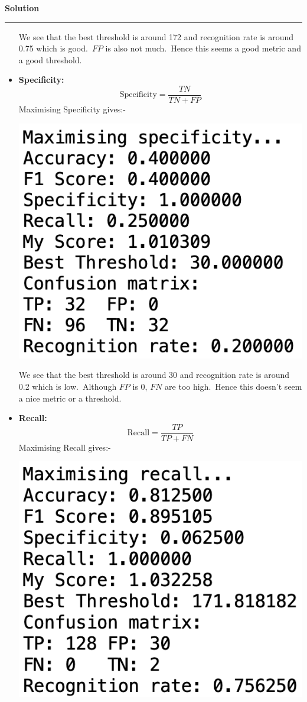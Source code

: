 \documentclass[a4paper,12pt]{article}
\newenvironment{solution}[2][]{%
    \begin{mdframed}[linecolor=blue!70!black, linewidth=2pt, roundcorner=10pt, backgroundcolor=yellow!10!white, skipabove=12pt, skipbelow=12pt]%
        \textbf{\large #2}
        \par\noindent\rule{\textwidth}{0.4pt}
}{
    \end{mdframed}
}
\begin{document}
\begin{solution}{Solution}
\begin{itemize}
\begin{center}
		\end{center}
		We see that the best threshold is around 172 and recognition rate is around 0.75 which is good.\ $FP$ is also not much.\ Hence this seems a good metric and a good threshold.
		\item \textbf{Specificity:}
		\[
			\text{Specificity} = \frac{TN}{TN+FP}
		\]
		Maximising Specificity gives:-
		\begin{center}
			\includegraphics[scale=0.5]{../images/specificity.png}
		\end{center}
		We see that the best threshold is around 30 and recognition rate is around 0.2 which is low.\ Although $FP$ is 0, $FN$ are too high.\ Hence this doesn't seem a nice metric or a threshold.
		\item \textbf{Recall:}
		\[
			\text{Recall} = \frac{TP}{TP+FN}
		\]
		Maximising Recall gives:-
		\begin{center}
			\includegraphics[scale=0.5]{../images/recall.png}

\end{center}
\end{itemize}
\end{solution}
\end{document}
